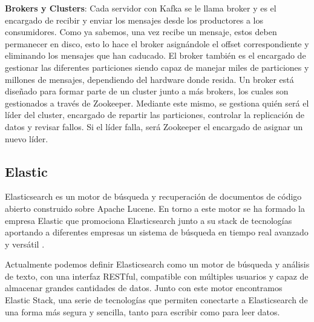 \textbf{Brokers y Clusters}: Cada servidor con Kafka se le llama broker y es el encargado de recibir y enviar los mensajes desde los productores a los consumidores. Como ya sabemos, una vez recibe un mensaje, estos deben permanecer en disco, esto lo hace el broker asignándole el offset correspondiente y eliminando los mensajes que han caducado. El broker también es el encargado de gestionar las diferentes particiones siendo capaz de manejar miles de particiones y millones de mensajes, dependiendo del hardware donde resida. Un broker está diseñado para formar parte de un cluster junto a más brokers, los cuales son gestionados a través de Zookeeper. Mediante este mismo, se gestiona quién será el líder del cluster, encargado de repartir las particiones, controlar la replicación de datos y revisar fallos. Si el líder falla, será Zookeeper el encargado de asignar un nuevo líder. 


\subsection{Elastic\label{Elastic}}

Elasticsearch es un motor de búsqueda y recuperación de documentos de código abierto construido sobre Apache Lucene. En torno a este motor se ha formado la empresa Elastic que promociona Elasticsearch junto a su stack de tecnologías aportando a diferentes empresas un sistema de búsqueda en tiempo real avanzado y versátil \cite{Elk-1}.\par

Actualmente podemos definir Elasticsearch como un motor de búsqueda y análisis de texto, con una interfaz RESTful, compatible con múltiples usuarios y capaz de almacenar grandes cantidades de datos. Junto con este motor encontramos Elastic Stack, una serie de tecnologías que permiten conectarte a Elasticsearch de una forma más segura y sencilla, tanto para escribir como para leer datos.\par

